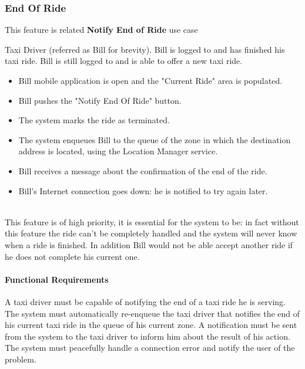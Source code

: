\subsubsection{End Of Ride}
This feature is related \textbf{Notify End of Ride} use case
\begin{itemize}
	 Taxi Driver (referred as Bill for brevity).
	 Bill is logged to \myTaxiService{} and has finished his taxi ride.
	 Bill is still logged to \myTaxiService{} and is able to offer a new taxi ride.
	\begin{itemize}
		\item Bill \myTaxiService{} mobile application is open and the "Current Ride" area is populated.
		\item Bill pushes the "Notify End Of Ride" button.
		\item The system marks the ride as terminated.
		\item The system enqueues Bill to the queue of the zone in which the destination address is located, using the Location Manager service.
		\item Bill receives a message about the confirmation of the end of the ride. 
	\end{itemize}
	\begin{itemize}
		\item Bill's Internet connection goes down: he is notified to try again later.
	\end{itemize}
\end{itemize}
\\
This feature is of high priority, it is essential for the system to be: in fact without this feature the ride can't be completely handled and the system will never know when a ride is finished.
In addition Bill would not be able accept another ride if he does not complete his current one.
\paragraph{Functional Requirements}
\begin{itemize}
	 A taxi driver must be capable of notifying the end of a taxi ride he is serving.
	 The system must automatically re-enqueue the taxi driver that notifies the end of his current taxi ride in the queue of his current zone.
	 A notification must be sent from the system to the taxi driver to inform him about the result of his action.
	 The system must peacefully handle a connection error and notify the user of the problem.
\end{itemize}

